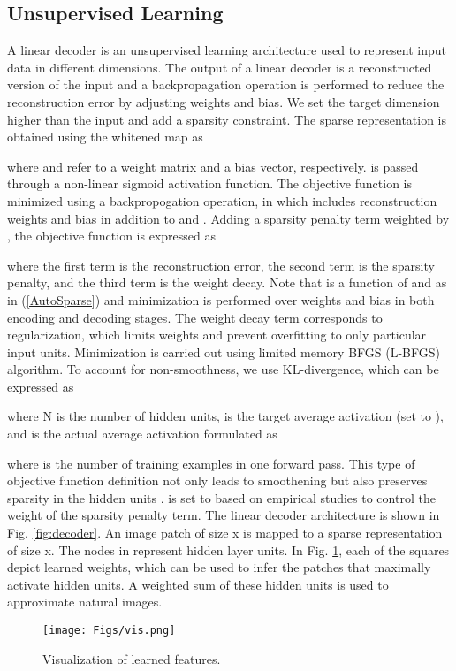 \documentclass[draftcls,12pt, onecolumn]{IEEEtran}
\begin{document}
\subsection{Unsupervised Learning}
A linear decoder is an unsupervised learning architecture used to represent input data in different dimensions. The output of a linear decoder is a reconstructed version of the input and a backpropagation operation is performed to reduce the reconstruction error by adjusting weights and bias. We set the target dimension higher than the input and add a sparsity constraint. The sparse representation  is obtained using the whitened map  as 
\vspace{-3.5mm}

where  and  refer to a weight matrix and a bias vector, respectively.  is passed through a non-linear sigmoid activation function.  The objective function  is minimized using a backpropogation operation, in which  includes reconstruction weights  and bias  in addition to  and . Adding a sparsity penalty term weighted by , the objective function is expressed as
\vspace{-3.0mm}

where the first term is the reconstruction error, the second term is the sparsity penalty, and the third term is the weight decay. Note that  is a function of  and  as in (\ref{AutoSparse}) and minimization is performed over weights and bias in both encoding and decoding stages. The weight decay term corresponds to regularization, which limits weights and prevent overfitting to only particular input units. Minimization is carried out using limited memory BFGS (L-BFGS) algorithm. To account for non-smoothness, we use KL-divergence, which can be expressed as 
\vspace{-2.0mm}

where N is the number of hidden units,  is the target average activation (set to ), and  is the actual average activation formulated as
\vspace{-3.5mm}

where  is the number of training examples in one forward pass. This type of objective function definition not only leads to smoothening but also preserves sparsity in the hidden units \cite{bradley2008differential}.
 is set to  based on empirical studies
to control the weight of the sparsity penalty term. The linear decoder architecture is shown in Fig. \ref{fig:decoder}. An image patch of size x is mapped to a sparse representation of size x. The nodes in  represent hidden layer units. In Fig. \ref{fig:vis}, each of the squares depict learned weights, which can be used to infer the patches that maximally activate hidden units. A weighted sum of these hidden units is used to approximate natural images.
\begin{figure}[htbp!]\label{Visualize}
	\begin{center}
		\noindent
		\texttt{[image: Figs/vis.png]}
		\vspace{-1.0mm}
		\caption{Visualization of learned features.}
		\vspace{-1.0mm}
		\label{fig:vis}
	\end{center}
\vspace{-8.0mm}
\end{figure}
\end{document}
